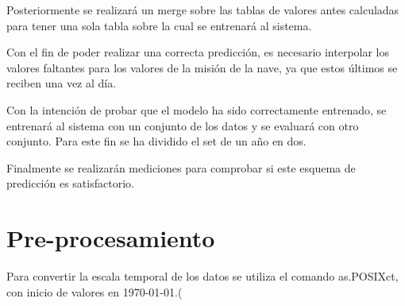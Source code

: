 \documentclass[../Main.tex]{subfiles}
\begin{document}
Posteriormente se realizará un merge sobre las tablas de valores antes calculadas para tener una sola tabla sobre la cual se entrenará al sistema. 

Con el fin de poder realizar una correcta predicción, es necesario interpolar los valores faltantes para los valores de la misión de la nave, ya que estos últimos se reciben una vez al día.

Con la intención de probar que el modelo ha sido correctamente entrenado, se entrenará al sistema con un conjunto de los datos y se evaluará con otro conjunto. Para este fin se ha dividido el set de un año en dos.

Finalmente se realizarán mediciones para comprobar si este esquema de predicción es satisfactorio.

\section{Pre-procesamiento}
Para convertir la escala temporal de los datos se utiliza el comando as.POSIXct, con inicio de valores en 1970-01-01.(%
\end{document}
